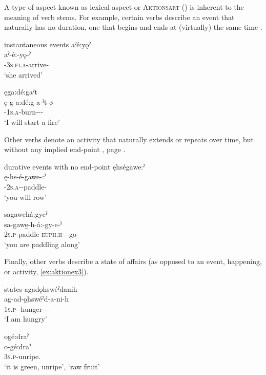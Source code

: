 A type of aspect known as lexical aspect or \textsc{Aktionsart} (\cite{vendler_verbs_1957}) is inherent to the meaning of verb stems. For example, certain verbs describe an event that naturally has no duration, one that begins and ends at (virtually) the same time . 

\ea\label{ex:aktionex} instantaneous events
\ea aˀé:yǫˀ\\
\gll aˀ-é:-yǫ-ˀ\\
 {\factual}-\textsc{3s.fi.a}-arrive-{\punctual}\\
\glt `she arrived'

\ex ęga:dé:gaˀt\\
\gll ę-g-a:dé:g-a-ˀt-ø\\
 \fut-\textsc{1s.a}-burn-{\joinerA}-{\causative}-{\zeropunctual}\\
\glt `I will start a fire'
\z
\z

Other verbs denote an activity that naturally extends or repeats over time, but without any implied end-point , page \pageref{ex:aktionex2}.

\FloatBarrier
\ea\label{ex:aktionex2} durative events with no end-point
\ea ęhségawe:ˀ\\
\gll ę-hs-é-gawe-:ˀ\\
 \fut-\textsc{2s.a}-{\joinerE}-paddle-{\punctual}\\
\glt `you will row'

\ex sagawe̱há:gyeˀ\\
\gll sa-gawe̱-h-á:-gy-e-ˀ\\
 \textsc{2s.p}-paddle-\textsc{euph.h}-{\joinerA}-{\progressive}-go-{\stative}\\
\glt `you are paddling along'
\z
\z

Finally, other verbs describe a state of affairs (as opposed to an event, happening, or activity, \ref{ex:aktionex3}). 

\ea\label{ex:aktionex3} states
\ea agadǫ̱hswéˀdanih\\
\gll ag-ad-ǫ̱hswéˀd-a-ni-h\\
 \textsc{1s.p}-{\semireflexive}-hunger-{\joinerA}-{\benefactive}-{\habitual}\\
\glt `I am hungry'

\ex ogé:draˀ \\
\gll o-gé:draˀ\\
 \textsc{3s.p}-unripe.{\stative}\\
\glt ‘it is green, unripe’, `raw fruit'
\z
\z

